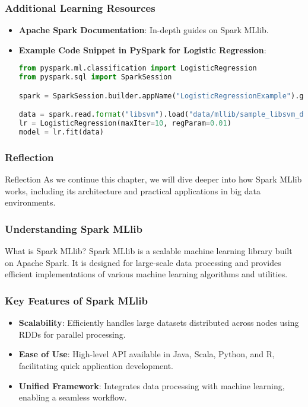 \documentclass[aspectratio=169]{beamer}
\begin{document}
\begin{frame}[fragile]
    \frametitle{Additional Learning Resources}
    \begin{itemize}
        \item \textbf{Apache Spark Documentation}: In-depth guides on Spark MLlib.
        \item \textbf{Example Code Snippet in PySpark for Logistic Regression}:
            \begin{lstlisting}[language=Python]
from pyspark.ml.classification import LogisticRegression
from pyspark.sql import SparkSession

spark = SparkSession.builder.appName("LogisticRegressionExample").getOrCreate()

data = spark.read.format("libsvm").load("data/mllib/sample_libsvm_data.txt")
lr = LogisticRegression(maxIter=10, regParam=0.01)
model = lr.fit(data)
            \end{lstlisting}
    \end{itemize}
\end{frame}

\begin{frame}[fragile]
    \frametitle{Reflection}
    \begin{block}{Reflection}
        As we continue this chapter, we will dive deeper into how Spark MLlib works, including its architecture and practical applications in big data environments.
    \end{block}
\end{frame}

\begin{frame}[fragile]
    \frametitle{Understanding Spark MLlib}
    \begin{block}{What is Spark MLlib?}
        Spark MLlib is a scalable machine learning library built on Apache Spark. It is designed for large-scale data processing and provides efficient implementations of various machine learning algorithms and utilities.
    \end{block}
\end{frame}

\begin{frame}[fragile]
    \frametitle{Key Features of Spark MLlib}
    \begin{itemize}
        \item \textbf{Scalability}: Efficiently handles large datasets distributed across nodes using RDDs for parallel processing.
        \item \textbf{Ease of Use}: High-level API available in Java, Scala, Python, and R, facilitating quick application development.
        \item \textbf{Unified Framework}: Integrates data processing with machine learning, enabling a seamless workflow.
    \end{itemize}
\end{frame}
\end{document}

